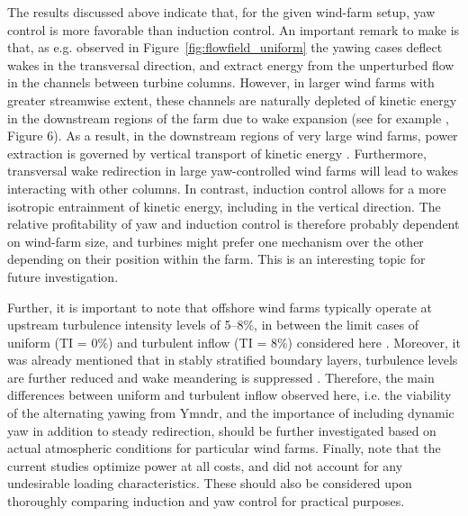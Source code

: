 The results discussed above indicate that, for the given wind-farm setup, yaw control is more favorable than induction control.
An important remark to make is that, as e.g. observed in Figure~\ref{fig:flowfield_uniform} the yawing cases deflect wakes in the transversal direction, and extract energy from the unperturbed flow in the channels between turbine columns. However, in larger wind farms with greater streamwise extent, these channels are naturally depleted of kinetic energy in the downstream regions of the farm due to wake expansion (see for example \cite{allaerts2017boundary}, Figure 6). As a result, in the downstream regions of very large wind farms, power extraction is governed by vertical transport of kinetic energy \citep{cal2010experimental, calaf2010large}. Furthermore, transversal wake redirection in large yaw-controlled wind farms will lead to wakes interacting with other columns. In contrast, induction control allows for a more isotropic entrainment of kinetic energy, including in the vertical direction. The relative profitability of yaw and induction control is therefore probably dependent on wind-farm size, and turbines might prefer one mechanism over the other depending on their position within the farm. This is an interesting topic for future investigation.

Further, it is important to note that offshore wind farms typically operate at upstream turbulence intensity levels of 5--8\%, in between the limit cases of uniform (TI = 0\%) and turbulent inflow (TI = 8\%) considered here \cite{barthelmie2005ten, barthelmie2009modelling}. Moreover, it was already mentioned that in stably stratified boundary layers, turbulence levels are further reduced and wake meandering is suppressed \citep{larsen2009dependence,machefaux2016experimental}. Therefore, the main differences between uniform and turbulent inflow observed here, i.e. the viability of the alternating yawing from Ymndr, and the importance of including dynamic yaw in addition to steady redirection, should be further investigated based on actual atmospheric conditions for particular wind farms. Finally, note that the current studies optimize power at all costs, and did not account for any undesirable loading characteristics. These should also be considered upon thoroughly comparing induction and yaw control for practical purposes.

